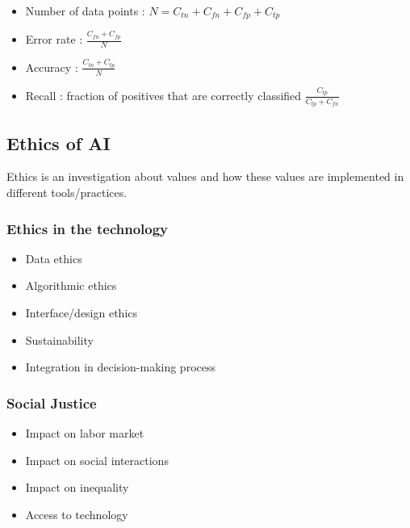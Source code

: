 \documentclass[../main.tex]{subfiles}
\begin{document}
\begin{itemize}
    \item Number of data points : $N = C_{tn}+C_{fn}+C_{fp}+C_{tp}$\\
    \item Error rate : $\frac{C_{fn}+C_{fp}}{N}$\\
    \item Accuracy : $\frac{C_{tn}+C_{tp}}{N}$\\
    \item Recall : fraction of positives that are correctly classified $\frac{C_{tp}}{C_{tp}+C_{fn}}$\\
\end{itemize}

\subsection{Ethics of AI}
Ethics is an investigation about values and how these values are implemented in different tools/practices.\\

\subsubsection{Ethics in the technology}
\begin{itemize}
    \item Data ethics\\
    \item Algorithmic ethics\\
    \item Interface/design ethics\\
    \item Sustainability\\
    \item Integration in decision-making process\\
\end{itemize}

\subsubsection{Social Justice}
\begin{itemize}
    \item Impact on labor market\\
    \item Impact on social interactions\\
    \item Impact on inequality\\
    \item Access to technology\\
\end{itemize}
\end{document}
